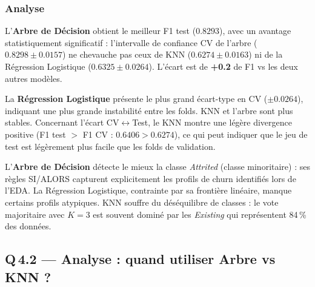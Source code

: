 \documentclass[12pt,a4paper]{article}
\begin{document}
\subsubsection{Analyse}

\begin{reponsebox}
L'\textbf{Arbre de Décision} obtient le meilleur F1 test ($0.8293$), avec un avantage
statistiquement significatif : l'intervalle de confiance CV de l'arbre ($0.8298 \pm 0.0157$)
ne chevauche pas ceux de KNN ($0.6274 \pm 0.0163$) ni de la Régression Logistique
($0.6325 \pm 0.0264$). L'écart est de \textbf{+0.2} de F1 vs les deux autres modèles.
\end{reponsebox}

\begin{reponsebox}
La \textbf{Régression Logistique} présente le plus grand écart-type en CV ($\pm 0.0264$),
indiquant une plus grande instabilité entre les folds. KNN et l'arbre sont plus stables.
Concernant l'écart CV$\leftrightarrow$Test, le KNN montre une légère divergence
positive (F1 test $> $ F1 CV : $0.6406 > 0.6274$), ce qui peut indiquer
que le jeu de test est légèrement plus facile que les folds de validation.
\end{reponsebox}

\begin{reponsebox}
L'\textbf{Arbre de Décision} détecte le mieux la classe \emph{Attrited} (classe minoritaire) :
ses règles SI/ALORS capturent explicitement les profils de churn identifiés lors de l'EDA.
La Régression Logistique, contrainte par sa frontière linéaire, manque certains profils atypiques.
KNN souffre du déséquilibre de classes : le vote majoritaire avec $K=3$ est souvent
dominé par les \emph{Existing} qui représentent 84\,\% des données.
\end{reponsebox}

\subsection{Q\,4.2 — Analyse : quand utiliser Arbre vs KNN ?}
\end{document}

